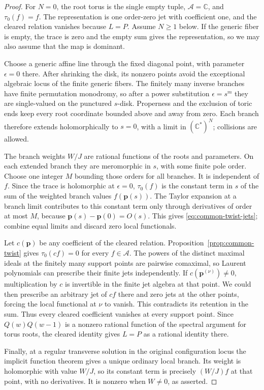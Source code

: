 \begin{proof}
For $N=0$, the root torus is the single empty tuple,
$\mathcal A=\mathbb C$, and $\tau_0(f)=f$. The representation is
one order-zero jet with coefficient one, and the cleared relation
vanishes because $L=P$. Assume $N\ge1$ below. If the generic
fiber is empty, the trace is zero and the empty sum gives the
representation, so we may also assume that the map is dominant.

Choose a generic affine line through the fixed diagonal point, with
parameter $\epsilon=0$ there. After shrinking the disk, its nonzero
points avoid the exceptional algebraic locus of the finite generic
fibers. The finitely many inverse branches have finite permutation
monodromy, so after a power substitution $\epsilon=s^m$ they are
single-valued on the punctured $s$-disk. Properness and the exclusion
of toric ends keep every root coordinate bounded above and away from
zero. Each branch therefore extends holomorphically to $s=0$, with
a limit in $(\mathbb C^*)^N$; collisions are allowed.

The branch weights $W/J$ are rational functions of the roots and
parameters. On each extended branch they are meromorphic in $s$,
with some finite pole order. Choose one integer $M$ bounding those
orders for all branches. It is independent of $f$. Since the trace
is holomorphic at $\epsilon=0$, $\tau_0(f)$ is the constant term in
$s$ of the sum of the weighted branch values $f(\mathbf p(s))$.
The Taylor expansion at a branch limit contributes to this constant
term only through derivatives of order at most $M$, because
$\mathbf p(s)-\mathbf p(0)=O(s)$. This gives
\eqref{eq:common-twist-jets}; combine equal limits and discard zero
local functionals.

Let $c(\mathbf p)$ be any coefficient of the cleared relation.
Proposition~\ref{prop:common-twist} gives $\tau_0(cf)=0$ for every
$f\in\mathcal A$. The powers of the distinct maximal ideals at the
finitely many support points are pairwise comaximal, so Laurent
polynomials can prescribe their finite jets independently. If
$c(\mathbf p^{(\nu)})\ne0$, multiplication by $c$ is invertible in
the finite jet algebra at that point. We could then prescribe an
arbitrary jet of $cf$ there and zero jets at the other points,
forcing the local functional at $\nu$ to vanish. This contradicts
its retention in the sum. Thus every cleared coefficient vanishes
at every support point. Since $Q(w)Q(w-1)$ is a nonzero rational
function of the spectral argument for torus roots, the cleared
identity gives $L=P$ as a rational identity there.

Finally, at a regular transverse solution in the original
configuration locus the implicit function theorem gives a unique
ordinary local branch. Its weight is holomorphic with value $W/J$,
so its constant term is precisely $(W/J)f$ at that point, with no
derivatives. It is nonzero when $W\ne0$, as asserted.
\end{proof}
